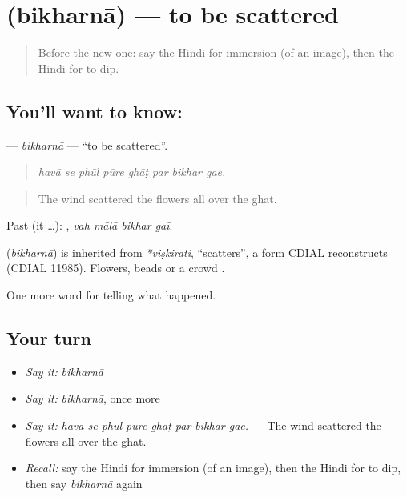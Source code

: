 \section[\texorpdfstring{\hi{बिखरना} (bikharnā)}{बिखरना (bikharnā)}]{ (bikharnā) — to be scattered}

\label{lesson:HI-C333-bikharna}



\begin{quote}
Before the new one: say the Hindi for immersion (of an image), then the Hindi for to dip.
\end{quote}

\subsection*{You'll want to know: }
\textbf{} — \emph{bikharnā} — \textquotedblleft{}to be scattered\textquotedblright{}.

\begin{quote}
       
\end{quote}

\begin{quote}
\emph{havā se phūl pūre ghāṭ par bikhar gae.}
\end{quote}

\begin{quote}
The wind scattered the flowers all over the ghat.
\end{quote}

Past (it …):    , \emph{vah mālā bikhar gaī}.

\begin{cousinweb}
\textbf{} (\emph{bikharnā}) is inherited from \emph{*viṣkirati}, \textquotedblleft{}scatters\textquotedblright{}, a form CDIAL reconstructs (CDIAL 11985). Flowers, beads or a crowd \textbf{ }.
\end{cousinweb}

\begin{grammarlens}[title={What you've built}]
One more word for telling what happened.
\end{grammarlens}

\subsection*{Your turn}
\begin{itemize}
\raggedright
  \item \emph{Say it:} \emph{bikharnā}
  \item \emph{Say it:} \emph{bikharnā}, once more
  \item \emph{Say it:} \emph{havā se phūl pūre ghāṭ par bikhar gae.} — The wind scattered the flowers all over the ghat.
  \item \emph{Recall:} say the Hindi for immersion (of an image), then the Hindi for to dip, then say \emph{bikharnā} again
\end{itemize}


